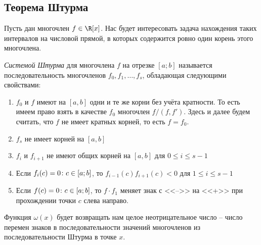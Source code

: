 \subsection{Теорема Штурма}

Пусть дан многочлен $f\in\R[x]$. Нас будет интересовать задача нахождения таких интервалов на числовой прямой, в которых содержится ровно один корень этого многочлена.

\begin{df}
  \emph{Системой Штурма} для многочлена $f$ на отрезке $[a;b]$ называется последовательность многочленов $f_0, f_1,\dots, f_s$, обладающая следующими свойствами:
  \begin{enumerate}
    \item $f_0$ и $f$ имеют на $[a,b]$ одни и те же корни без учёта кратности. То есть имеем право взять в качестве $f_0$ многочлен $f/(f,f')$. Здесь и далее будем считать, что $f$ не имеет кратных корней, то есть $f=f_0$.
    \item $f_s$ не имеет корней на $[a,b]$
    \item $f_i$ и $f_{i+1}$ не имеют общих корней на $[a,b]$ для $0\le i\le s-1$
    \item Если $f_i(c)=0\colon c\in[a;b]$, то $f_{i-1}(c)f_{i+1}(c)<0$ для $1\le i\le s-1$
    \item Если $f(c)=0\colon c\in[a;b]$, то $f\cdot f_1$ меняет знак с <<-->> на <<+>> при прохождении точки $c$ слева направо.
  \end{enumerate}
\end{df}

Функция $\omega(x)$ будет возвращать нам целое неотрицательное число -- число перемен знаков в последовательности значений многочленов из последовательности Штурма в точке $x$.

